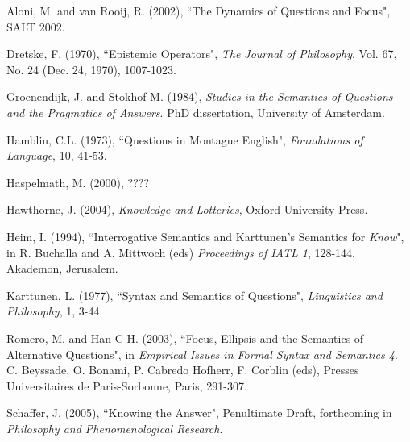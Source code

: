 \begin{thebibliography}{99}

 Aloni, M. and van Rooij, R. (2002), ``The Dynamics
of Questions and Focus", SALT 2002.

 Dretske, F. (1970), ``Epistemic Operators", \emph{The Journal of Philosophy},
Vol. 67, No. 24 (Dec. 24, 1970), 1007-1023.

 Groenendijk, J. and Stokhof M. (1984), \emph{Studies
in the Semantics of Questions and the Pragmatics of Answers}. PhD
dissertation, University of Amsterdam.

 Hamblin, C.L. (1973), ``Questions in Montague
English", \emph{Foundations of Language}, 10, 41-53.

 Haspelmath, M. (2000), ????

 Hawthorne, J. (2004), \emph{Knowledge and
Lotteries}, Oxford University Press.

 Heim, I. (1994), ``Interrogative Semantics and Karttunen's
Semantics for \emph{Know}", in R. Buchalla and A. Mittwoch (eds)
\emph{Proceedings of IATL 1}, 128-144. Akademon, Jerusalem.

 Karttunen, L. (1977), ``Syntax and Semantics of
Questions", \emph{Linguistics and Philosophy}, 1, 3-44.

 Romero, M. and Han C-H. (2003), ``Focus, Ellipsis and
the Semantics of Alternative Questions", in \emph{Empirical Issues
in Formal Syntax and Semantics 4}. C. Beyssade, O. Bonami, P.
Cabredo Hofherr, F. Corblin (eds), Presses Universitaires de
Paris-Sorbonne, Paris, 291-307.

 Schaffer, J. (2005), ``Knowing the Answer",
Penultimate Draft, forthcoming in \emph{Philosophy and
Phenomenological Research}.


\end{thebibliography}
